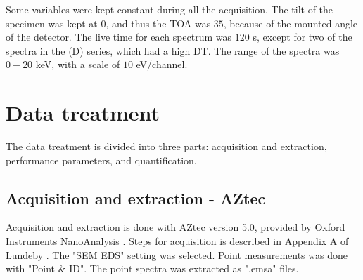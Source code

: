 Some variables were kept constant during all the acquisition.
The tilt of the specimen was kept at $0$\textdegree, and thus the TOA was $35$\textdegree, because of the mounted angle of the detector.
The live time for each spectrum was $120$ s, except for two of the spectra in the (D) series, which had a high DT.
The range of the spectra was $0-20$ keV, with a scale of $10$ eV/channel.


























\section{Data treatment}
\label{method:data_treatment}

The data treatment is divided into three parts: acquisition and extraction, performance parameters, and quantification.

\subsection{Acquisition and extraction - AZtec}
\label{method:data_treatment:aztec}

Acquisition and extraction is done with AZtec version 5.0, provided by Oxford Instruments NanoAnalysis \cite{aztec_manual}.
Steps for acquisition is described in Appendix A of Lundeby \cite{lundeby_improving_2019}.
The "SEM EDS" setting was selected.
Point measurements was done with "Point \& ID".
The point spectra was extracted as ".emsa" files.

